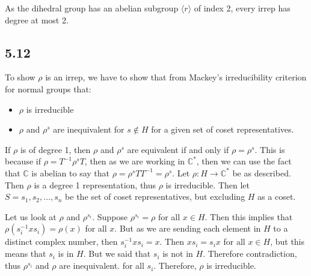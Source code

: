 \documentclass[]{article}
\begin{document}
As the dihedral group has an abelian subgroup $\langle r \rangle$ of index 2, every irrep has degree at most 2.

\subsection*{5.12}
To show $\rho$ is an irrep, we have to show that from Mackey's irreducibility criterion for normal groups that:
\begin{itemize}
	\item $\rho$ is irreducible
	\item $\rho$ and $\rho^s$ are inequivalent for $s \notin H$ for a given set of coset representatives.
\end{itemize}
If $\rho$ is of degree 1, then $\rho$ and $\rho^s$ are equivalent if and only if $\rho = \rho^s$. This is because if $\rho = T^{-1} \rho^s T$, then as we are working in $\mathbb{C}^*$, then we can use the fact that $\mathbb{C}$ is abelian to say that $\rho = \rho^s T T^{-1} = \rho^s$.   
Let $\rho : H \rightarrow \mathbb{C}^*$ be as described. Then $\rho$ is a degree 1 representation, thus $\rho$ is irreducible. Then let $S = {s_1, s_2, ..., s_n}$ be the set of coset representatives, but excluding $H$ as a coset.

Let us look at $\rho$ and $\rho^{s_i}$. Suppose $\rho^{s_i} = \rho$ for all $x \in H$. Then this implies that $\rho(s_i^{-1} x s_i) = \rho(x)$ for all $x$. But as we are sending each element in $H$ to a distinct complex number, then $s_i^{-1} x s_i = x$. Then $x s_i = s_i x$ for all $x \in H$, but this means that $s_i$ is in $H$. But we said that $s_i$ is not in $H$. Therefore contradiction, thus $\rho^{s_i}$ and $\rho$ are inequivalent. for all $s_i$. Therefore, $\rho$ is irreducible. 
\end{document}
